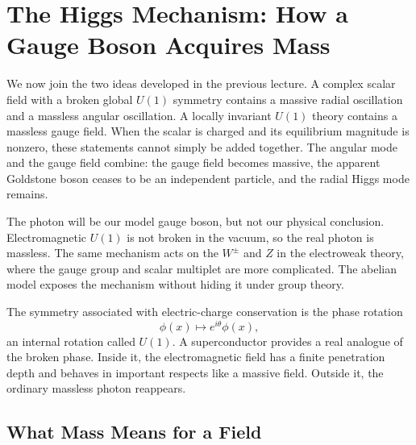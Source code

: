 \chapter{The Higgs Mechanism: How a Gauge Boson Acquires Mass}

We now join the two ideas developed in the previous lecture. A complex scalar
field with a broken global \(U(1)\) symmetry contains a massive radial
oscillation and a massless angular oscillation. A locally invariant \(U(1)\)
theory contains a massless gauge field. When the scalar is charged and its
equilibrium magnitude is nonzero, these statements cannot simply be added
together. The angular mode and the gauge field combine: the gauge field
becomes massive, the apparent Goldstone boson ceases to be an independent
particle, and the radial Higgs mode remains.

The photon will be our model gauge boson, but not our physical conclusion.
Electromagnetic \(U(1)\) is not broken in the vacuum, so the real photon is
massless. The same mechanism acts on the \(W^\pm\) and \(Z\) in the
electroweak theory, where the gauge group and scalar multiplet are more
complicated. The abelian model exposes the mechanism without hiding it under
group theory.

\begin{classroomqa}
\end{classroomqa}

The symmetry associated with electric-charge conservation is the phase
rotation
\begin{equation}
  \phi(x)\longmapsto e^{i\theta}\phi(x),
\end{equation}
an internal rotation called \(U(1)\). A superconductor provides a real
analogue of the broken phase. Inside it, the electromagnetic field has a
finite penetration depth and behaves in important respects like a massive
field. Outside it, the ordinary massless photon reappears.

\section{What Mass Means for a Field}

